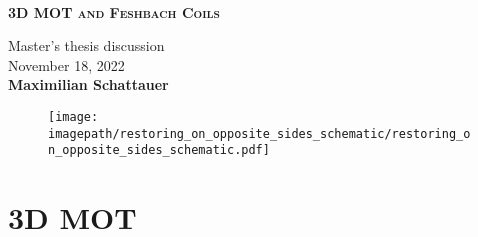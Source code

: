 \newcommand{\textpath}{../text}
\newcommand{\imagepath}{}




\begin{frame}
	\begin{center}
		\begin{block}
			{\centering \\
				\medskip
				\textbf{\textsc{3D MOT and Feshbach Coils}}\\
				\medskip}
		\end{block}

		\bigskip

		Master's thesis discussion\\
		\medskip
		November 18, 2022\\

		\vspace{1cm}
		\textbf{Maximilian Schattauer}
	\end{center}
\end{frame}

\renewcommand{\imagepath}{\textpath/30-mot/img}

\begin{frame}
	\begin{figure}
        \raggedleft
        \texttt{[image: \\imagepath/restoring\_on\_opposite\_sides\_schematic/restoring\_on\_opposite\_sides\_schematic.pdf]}
    \end{figure}
    \section{3D MOT}
\end{frame}

